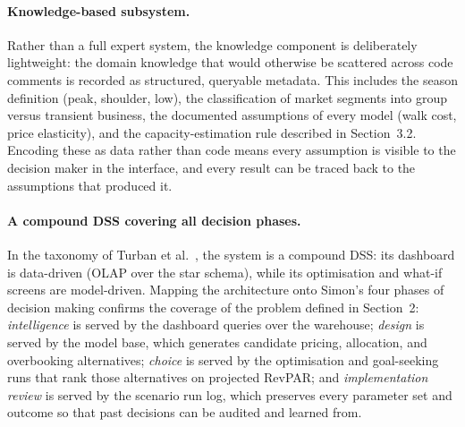 \paragraph{Knowledge-based subsystem.}
Rather than a full expert system, the knowledge component is deliberately lightweight: the domain knowledge that would otherwise be scattered across code comments is recorded as structured, queryable metadata. This includes the season definition (peak, shoulder, low), the classification of market segments into group versus transient business, the documented assumptions of every model (walk cost, price elasticity), and the capacity-estimation rule described in Section~3.2. Encoding these as data rather than code means every assumption is visible to the decision maker in the interface, and every result can be traced back to the assumptions that produced it.

\paragraph{A compound DSS covering all decision phases.}
In the taxonomy of Turban et al.~\cite{turban2011}, the system is a compound DSS: its dashboard is data-driven (OLAP over the star schema), while its optimisation and what-if screens are model-driven. Mapping the architecture onto Simon's four phases of decision making confirms the coverage of the problem defined in Section~2: \emph{intelligence} is served by the dashboard queries over the warehouse; \emph{design} is served by the model base, which generates candidate pricing, allocation, and overbooking alternatives; \emph{choice} is served by the optimisation and goal-seeking runs that rank those alternatives on projected RevPAR; and \emph{implementation review} is served by the scenario run log, which preserves every parameter set and outcome so that past decisions can be audited and learned from.

